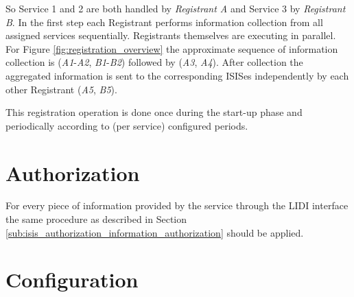 \documentclass{book}
\begin{document}
So Service 1 and 2 are both handled by \textit{Registrant A} and Service 3 by \textit{Registrant B}.
In the first step each Registrant performs information collection from all assigned services sequentially. Registrants themselves are executing in parallel. For Figure \ref{fig:registration_overview} the approximate sequence of information collection is (\textit{A1}-\textit{A2}, \textit{B1}-\textit{B2}) followed by (\textit{A3}, \textit{A4}). After collection  the aggregated information is sent to the corresponding ISISes independently by each other Registrant (\textit{A5}, \textit{B5}).

\begin{figure}[ht]
\end{figure}

This registration operation is done once during the start-up phase and periodically according to 
(per service) configured periods.



\section{Authorization}
\label{sec:service_authorization}

For every piece of information provided by the service through the LIDI interface the same procedure as described in 
Section \ref{sub:isis_authorization_information_authorization} should be applied.



\section{Configuration}
\label{sec:service_configuration}
\end{document}
